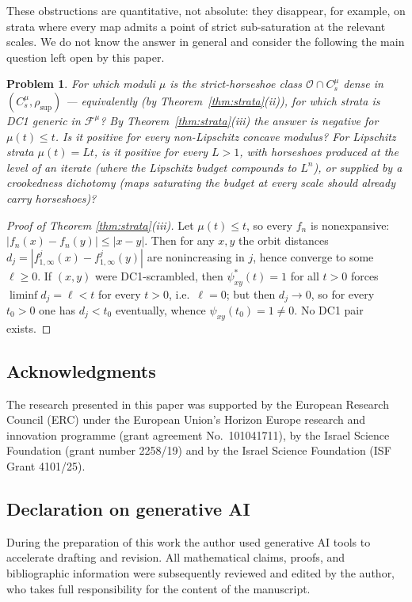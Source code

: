 ﻿\documentclass[11pt]{article}
\newtheorem{problem}[theorem]{Problem}
\newcommand{\rsup}{\rho_{\sup}}
\begin{document}
These obstructions are quantitative, not absolute: they disappear, for example,
on strata where every map admits a point of strict sub-saturation at the
relevant scales.  We do not know the answer in general and consider the
following the main question left open by this paper.

\begin{problem}\label{prob:strata}
For which moduli $\mu$ is the strict-horseshoe class $\mathcal O\cap C^\mu_s$
dense in $(C^\mu_s,\rsup)$ --- equivalently (by
Theorem~\ref{thm:strata}(ii)), for which strata is DC1 generic in
$\mathcal F^\mu$?  By Theorem~\ref{thm:strata}(iii) the answer is negative for
$\mu(t)\le t$.  Is it positive for every non-Lipschitz concave modulus?  For
Lipschitz strata $\mu(t)=Lt$, is it positive for every $L>1$, with horseshoes
produced at the level of an iterate (where the Lipschitz budget compounds to
$L^n$), or supplied by a crookedness dichotomy (maps saturating the budget at
every scale should already carry horseshoes)?
\end{problem}

\begin{proof}[Proof of Theorem \ref{thm:strata}(iii)]
Let $\mu(t)\le t$, so every $f_n$ is nonexpansive:
$|f_n(x)-f_n(y)|\le|x-y|$.  Then for any $x,y$ the orbit distances
$d_j=|f^j_{1,\infty}(x)-f^j_{1,\infty}(y)|$ are nonincreasing in $j$, hence
converge to some $\ell\ge0$.  If $(x,y)$ were DC1-scrambled, then
$\psi^*_{xy}(t)=1$ for all $t>0$ forces $\liminf d_j=\ell<t$ for every $t>0$,
i.e.\ $\ell=0$; but then $d_j\to0$, so for every $t_0>0$ one has $d_j<t_0$
eventually, whence $\psi_{xy}(t_0)=1\ne0$.  No DC1 pair exists.
\end{proof}


\subsection*{Acknowledgments}
The research presented in this paper was supported by the European Research Council
(ERC) under the European Union's Horizon Europe research and innovation programme
(grant agreement No.\ 101041711), by the Israel Science Foundation (grant number
2258/19) and by the Israel Science Foundation (ISF Grant 4101/25).

\subsection*{Declaration on generative AI}
During the preparation of this work the author used generative AI tools to
accelerate drafting and revision.  All mathematical claims, proofs, and
bibliographic information were subsequently reviewed and edited by the author, who
takes full responsibility for the content of the manuscript.
\end{document}
